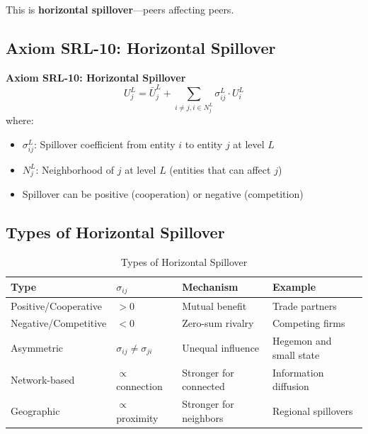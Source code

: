 This is \textbf{horizontal spillover}---peers affecting peers.

\subsection{Axiom SRL-10: Horizontal Spillover}

\begin{tcolorbox}[colback=gray!5!white, colframe=gray!75!black]
\textbf{Axiom SRL-10: Horizontal Spillover}
\begin{equation}
\boxed{
U^L_j = \bar{U}^L_j + \sum_{i \neq j, i \in N^L_j} \sigma^L_{ij} \cdot U^L_i
}
\end{equation}
where:
\begin{itemize}
\item $\sigma^L_{ij}$: Spillover coefficient from entity $i$ to entity $j$ at level $L$
\item $N^L_j$: Neighborhood of $j$ at level $L$ (entities that can affect $j$)
\item Spillover can be positive (cooperation) or negative (competition)
\end{itemize}
\end{tcolorbox}

\subsection{Types of Horizontal Spillover}

\begin{table}[htbp]
\centering
\caption{Types of Horizontal Spillover}
\label{tab:aaa-spillover-types}
\renewcommand{\arraystretch}{1.3}
\begin{tabular}{@{}llll@{}}
\toprule
\textbf{Type} & \textbf{$\sigma_{ij}$} & \textbf{Mechanism} & \textbf{Example} \\
\midrule
Positive/Cooperative & $> 0$ & Mutual benefit & Trade partners \\
Negative/Competitive & $< 0$ & Zero-sum rivalry & Competing firms \\
Asymmetric & $\sigma_{ij} \neq \sigma_{ji}$ & Unequal influence & Hegemon and small state \\
Network-based & $\propto$ connection & Stronger for connected & Information diffusion \\
Geographic & $\propto$ proximity & Stronger for neighbors & Regional spillovers \\
\bottomrule
\end{tabular}
\end{table}

